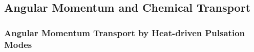 
\subsection{Angular Momentum and Chemical Transport}


{\color{brown}
\subsubsection{Angular Momentum Transport by Heat-driven Pulsation Modes}





}


